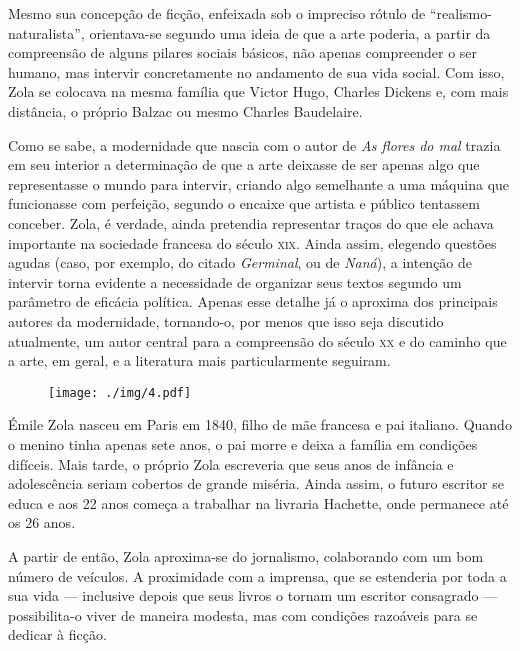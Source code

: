 Mesmo sua concepção de ficção, enfeixada sob o impreciso rótulo
de “realismo-naturalista”, orientava-se segundo uma ideia de que a
arte poderia, a partir da compreensão de alguns pilares sociais
básicos, não apenas compreender o ser humano, mas intervir
concretamente no andamento de sua vida social. Com isso, Zola se
colocava na mesma família que Victor Hugo, Charles Dickens e, com mais
distância, o próprio Balzac ou mesmo Charles Baudelaire.

Como se sabe, a modernidade que nascia com o autor de \textit{As flores do
mal} trazia em seu interior a determinação de que a arte deixasse de
ser apenas algo que representasse o mundo para intervir, criando algo
semelhante a uma máquina que funcionasse com perfeição, segundo o
encaixe que artista e público tentassem conceber. Zola, é verdade, ainda
pretendia representar traços do que ele achava importante na sociedade
francesa do século \textsc{xix}. Ainda assim, elegendo questões agudas (caso, por
exemplo, do citado \textit{Germinal}, ou de \textit{Naná}), a intenção
de intervir torna evidente a necessidade de organizar seus textos
segundo um parâmetro de eficácia política. Apenas esse detalhe já o
aproxima dos principais autores da modernidade, tornando-o, por menos
que isso seja discutido atualmente, um autor central para a compreensão
do século \textsc{xx} e do caminho que a arte, em geral, e a literatura mais
particularmente seguiram. 
\asterisc

\begin{figure}
\centering
\texttt{[image: ./img/4.pdf]}
\end{figure}

Émile Zola nasceu em Paris em 1840, filho de mãe francesa e pai
italiano. Quando o menino tinha apenas sete anos, o pai morre e deixa a
família em condições difíceis. Mais tarde, o próprio Zola escreveria
que seus anos de infância e adolescência seriam cobertos de grande
miséria. Ainda assim, o futuro escritor se educa e aos 22
anos começa a trabalhar na livraria Hachette, onde permanece até os
26 anos. 

 A partir de então, Zola aproxima-se do jornalismo, colaborando com um
bom número de veículos. A proximidade com a imprensa, que se estenderia
por toda a sua vida --- inclusive depois que seus livros o tornam um
escritor consagrado --- possibilita-o viver de maneira modesta, mas com
condições razoáveis para se dedicar à ficção. 

